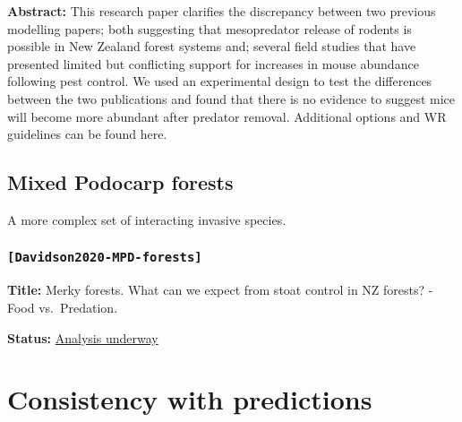 \textbf{Abstract:} This research paper clarifies the discrepancy between two previous modelling papers; both suggesting that mesopredator release of rodents is possible in New Zealand forest systems and; several field studies that have presented limited but conflicting support for increases in mouse abundance following pest control. We used an experimental design to test the differences between the two publications and found that there is no evidence to suggest mice will become more abundant after predator removal. Additional options and WR guidelines can be found here.

\hypertarget{mpd}{%
\section{Mixed Podocarp forests}\label{mpd}}

A more complex set of interacting invasive species.

\hypertarget{davidson2020-mpd-forests}{%
\subsection{\texorpdfstring{\texttt{{[}Davidson2020-MPD-forests{]}}}{{[}Davidson2020-MPD-forests{]}}}\label{davidson2020-mpd-forests}}

\textbf{Title:} Merky forests. What can we expect from stoat control in NZ forests? - Food vs.~Predation.

\textbf{Status:} \href{https://www.dropbox.com/s/fm57ns1jndmkmq1/Davidson_2019_mpd_manuscript.docx?dl=0}{Analysis underway}

\hypertarget{consistency-with-predictions}{%
\chapter{Consistency with predictions}\label{consistency-with-predictions}}

